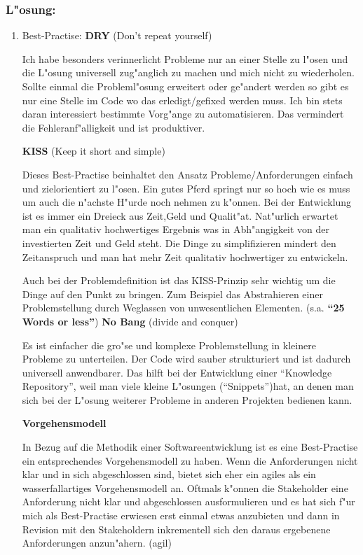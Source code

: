 \subsubsection*{L"osung:}
\begin{enumerate}
\item Best-Practise:
\smallbreak
\textbf{DRY} (Don't repeat yourself)

Ich habe besonders verinnerlicht Probleme nur an einer Stelle zu l"osen und die L"osung universell zug"anglich zu machen und mich nicht zu wiederholen. Sollte einmal die Probleml"osung erweitert oder ge"andert werden so gibt es nur eine Stelle im Code wo das erledigt/gefixed werden muss.
Ich bin stets daran interessiert bestimmte Vorg"ange zu automatisieren. Das vermindert die Fehleranf"alligkeit und ist produktiver.

\textbf{KISS} (Keep it short and simple)

Dieses Best-Practise beinhaltet den Ansatz Probleme/Anforderungen einfach und zielorientiert zu l"osen. Ein gutes Pferd springt nur so hoch wie es muss um auch die n"achste H"urde noch nehmen zu k"onnen.
Bei der Entwicklung ist es immer ein Dreieck aus Zeit,Geld und Qualit"at. Nat"urlich erwartet man ein qualitativ hochwertiges Ergebnis was in Abh"angigkeit von der investierten Zeit und Geld steht.
Die Dinge zu simplifizieren mindert den Zeitanspruch und man hat mehr Zeit qualitativ hochwertiger zu entwickeln.

Auch bei der Problemdefinition ist das KISS-Prinzip sehr wichtig um die Dinge auf den Punkt zu bringen. Zum Beispiel das Abstrahieren einer Problemstellung durch Weglassen von unwesentlichen Elementen. (s.a. \textbf{``25 Words or less''})
\newpage
\textbf{No Bang} (divide and conquer)

Es ist einfacher die gro"se und komplexe Problemstellung in kleinere Probleme zu unterteilen. Der Code wird sauber strukturiert und ist dadurch universell anwendbarer. Das hilft bei der Entwicklung einer ``Knowledge Repository'', weil man viele kleine L"osungen (``Snippets'')hat, an denen man sich bei der L"osung weiterer Probleme in anderen Projekten bedienen kann.

\textbf{Vorgehensmodell}

In Bezug auf die Methodik einer Softwareentwicklung ist es eine Best-Practise ein entsprechendes Vorgehensmodell zu haben. Wenn die Anforderungen nicht klar und in sich abgeschlossen sind, bietet sich eher ein agiles als ein wasserfallartiges Vorgehensmodell an.
Oftmals k"onnen die Stakeholder eine Anforderung nicht klar und abgeschlossen ausformulieren und es hat sich f"ur mich als Best-Practise erwiesen erst einmal etwas anzubieten und dann in Revision mit den Stakeholdern inkrementell sich den daraus ergebenene Anforderungen anzun"ahern. (agil)


\end{enumerate}
